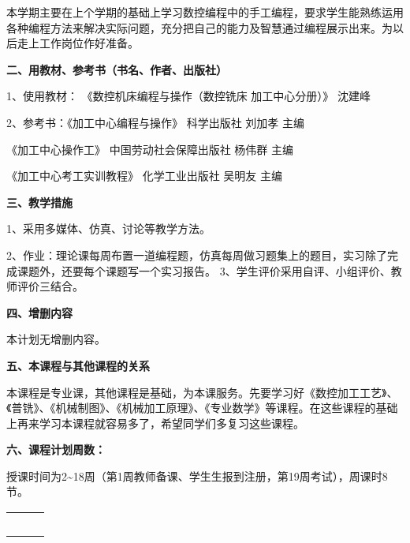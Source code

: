 \documentclass[12pt]{article}
\begin{document}
本学期主要在上个学期的基础上学习数控编程中的手工编程，要求学生能熟练运用各种编程方法来解决实际问题，充分把自己的能力及智慧通过编程展示出来。为以后走上工作岗位作好准备。

\textbf{二、用教材、参考书（书名、作者、出版社）}

1、使用教材： 《数控机床编程与操作（数控铣床 加工中心分册）》 沈建峰

2、参考书：《加工中心编程与操作》  科学出版社  刘加孝   主编

\hspace{4.5em}《加工中心操作工》 中国劳动社会保障出版社  杨伟群  主编

\hspace{4.5em}《加工中心考工实训教程》  化学工业出版社   吴明友 主编

\textbf{三、教学措施}

1、采用多媒体、仿真、讨论等教学方法。

2、作业：理论课每周布置一道编程题，仿真每周做习题集上的题目，实习除了完成课题外，还要每个课题写一个实习报告。
3、学生评价采用自评、小组评价、教师评价三结合。

\textbf{四、增删内容}

本计划无增删内容。

\textbf{五、本课程与其他课程的关系}

本课程是专业课，其他课程是基础，为本课服务。先要学习好《数控加工工艺》、《普铣》、《机械制图》、《机械加工原理》、《专业数学》等课程。在这些课程的基础上再来学习本课程就容易多了，希望同学们多复习这些课程。

\textbf{六、课程计划周数：}

授课时间为2\~{}18周（第1周教师备课、学生生报到注册，第19周考试），周课时8节。

\newpage 
\onecolumn \setlength{\parindent}{0em}

\begin{center}
	\begin{tabular}{M{12em}M{4cm}N}
		\parbox{12em}{\linespread{0.2} 
			\xiaosi \bf \song	{}\\[0.1cm]
		}
		&  \yihao \hei {}&\\
	\end{tabular}
\end{center}
 
\end{document}
